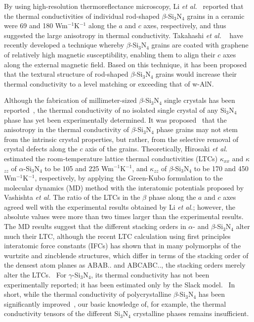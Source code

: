 \documentclass[twocolumn,amsmath,amssymb,a4paper,prb,superscriptaddress,floatfix]{revtex4-1}
\begin{document}
By using high-resolution thermoreflectance microscopy, Li {\it et
al.}~\cite{li} reported that the thermal conductivities of individual
rod-shaped $\beta$-Si$_3$N$_4$ grains in a ceramic were 69 and 180
Wm$^{-1}$K$^{-1}$ along the $a$ and $c$ axes, respectively, and thus suggested
the large anisotropy in thermal conductivity.  Takahashi {\it et al.}
~\cite{takahashi} have recently developed a technique whereby
$\beta$-Si$_3$N$_4$ grains are coated with graphene of relatively high magnetic
susceptibility, enabling them to align their $c$ axes along the external
magnetic field.  Based on this technique, it has been proposed that the
textural structure of rod-shaped $\beta$-Si$_3$N$_4$ grains would increase
their thermal conductivity to a level matching or exceeding that of w-AlN.

Although the fabrication of millimeter-sized $\beta$-Si$_3$N$_4$ single
crystals has been reported~\cite{yamamoto}, the thermal conductivity of no
isolated single crystal of any Si$_3$N$_4$ phase has yet been experimentally
determined.  It was proposed~\cite{watari-trans} that the anisotropy in the
thermal conductivity of $\beta$-Si$_3$N$_4$ phase grains may not stem from the
intrinsic crystal properties, but rather, from the selective removal of crystal
defects along the $c$ axis of the grains.  Theoretically, Hirosaki {\it et
al.}~\cite{hirosaki-md} estimated the room-temperature lattice thermal
conductivities (LTCs) $\kappa$$_{xx}$ and $\kappa$$_{zz}$ of
$\alpha$-Si$_3$N$_4$ to be 105 and 225 Wm$^{-1}$K$^{-1}$, and $\kappa$$_{zz}$
of $\beta$-Si$_3$N$_4$ to be 170 and 450 Wm$^{-1}$K$^{-1}$, respectively, by
applying the Green-Kubo formulation to the molecular dynamics (MD) method with
the interatomic potentials proposed by Vashishta {\it et al.} The ratio of the
LTCs in the $\beta$ phase along the $a$ and $c$ axes agreed well with the
experimental results obtained by Li {\it et al.}; however, the absolute values
were more than two times larger than the experimental results.  The MD results
suggest that the different stacking orders in $\alpha$- and $\beta$-Si$_3$N$_4$
alter much their LTC, although the recent LTC calculation using first
principles interatomic force constants (IFCs) has shown that in many polymorphs of the wurtzite
and zincblende structures, which differ in terms of the stacking order of the
densest atom planes as ABAB.. and ABCABC.., the stacking orders merely alter
the LTCs.~\cite{phono3py} For $\gamma$-Si$_3$N$_4$, its thermal conductivity
has not been experimentally reported; it has been estimated only by the Slack
model.~\cite{morelli} In short, while the thermal conductivity of
polycrystalline $\beta$-Si$_3$N$_4$ has been significantly
improved~\cite{zhou,hirao,watari,hirosaki}, our basic knowledge of, for
example, the thermal conductivity tensors of the different Si$_3$N$_4$
crystalline phases remains insufficient.
\end{document}
